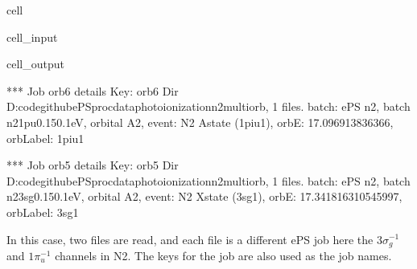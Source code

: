\documentclass[letterpaper,10pt,english]{jupyterBook}
\begin{document}
\begin{sphinxuseclass}{cell}\begin{sphinxVerbatimInput}

\begin{sphinxuseclass}{cell_input}
\begin{sphinxVerbatim}[commandchars=\\\{\}]
\end{sphinxVerbatim}

\end{sphinxuseclass}\end{sphinxVerbatimInput}
\begin{sphinxVerbatimOutput}

\begin{sphinxuseclass}{cell_output}
\begin{sphinxVerbatim}[commandchars=\\\{\}]
*** Job orb6 details
Key: orb6
Dir D:\PYGZbs{}code\PYGZbs{}github\PYGZbs{}ePSproc\PYGZbs{}data\PYGZbs{}photoionization\PYGZbs{}n2\PYGZus{}multiorb, 1 files.
\PYGZob{}   \PYGZsq{}batch\PYGZsq{}: \PYGZsq{}ePS n2, batch n2\PYGZus{}1pu\PYGZus{}0.1\PYGZhy{}50.1eV, orbital A2\PYGZsq{},
    \PYGZsq{}event\PYGZsq{}: \PYGZsq{} N2 A\PYGZhy{}state (1piu\PYGZhy{}1)\PYGZsq{},
    \PYGZsq{}orbE\PYGZsq{}: \PYGZhy{}17.096913836366,
    \PYGZsq{}orbLabel\PYGZsq{}: \PYGZsq{}1piu\PYGZhy{}1\PYGZsq{}\PYGZcb{}

*** Job orb5 details
Key: orb5
Dir D:\PYGZbs{}code\PYGZbs{}github\PYGZbs{}ePSproc\PYGZbs{}data\PYGZbs{}photoionization\PYGZbs{}n2\PYGZus{}multiorb, 1 files.
\PYGZob{}   \PYGZsq{}batch\PYGZsq{}: \PYGZsq{}ePS n2, batch n2\PYGZus{}3sg\PYGZus{}0.1\PYGZhy{}50.1eV, orbital A2\PYGZsq{},
    \PYGZsq{}event\PYGZsq{}: \PYGZsq{} N2 X\PYGZhy{}state (3sg\PYGZhy{}1)\PYGZsq{},
    \PYGZsq{}orbE\PYGZsq{}: \PYGZhy{}17.341816310545997,
    \PYGZsq{}orbLabel\PYGZsq{}: \PYGZsq{}3sg\PYGZhy{}1\PYGZsq{}\PYGZcb{}
\end{sphinxVerbatim}

\end{sphinxuseclass}\end{sphinxVerbatimOutput}

\end{sphinxuseclass}
\sphinxAtStartPar
In this case, two files are read, and each file is a different ePS job \sphinxhyphen{} here the \(3\sigma_g^{-1}\) and \(1\pi_u^{-1}\) channels in N2. The keys for the job are also used as the job names.
\end{document}
